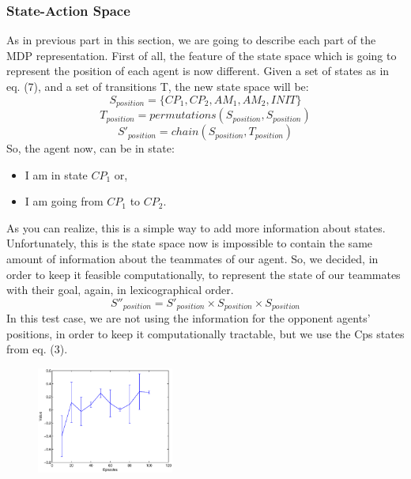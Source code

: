 \documentclass[conference]{IEEEtran}
\begin{document}
\subsubsection{State-Action Space}
As in previous part in this section, we are going to describe each part of the MDP representation. First of all, the feature of the state space which is going to represent the position of each agent is now different. Given a set of states as in eq. (7), and a set of transitions T, the new state space will be:
\begin{equation}
S_{position} = \lbrace CP_1, CP_2, AM_1, AM_2, INIT  \rbrace
\end{equation}
\begin{equation}
T_{position} = permutations(S_{position}, S_{position})
\end{equation}
\begin{equation}
S'_{position} = chain(S_{position}, T_{position})
\end{equation}
So, the agent now, can be in state:
\begin{itemize}
\item I am in state $CP_1$ or,
\item I am going from $CP_1$ to $CP_2$.
\end{itemize}
As you can realize, this is a simple way to add more information about states. Unfortunately, this is the state space now is impossible to contain the same amount of information about the teammates of our agent. So, we decided, in order to keep it feasible computationally, to represent the state of our teammates with their goal, again, in lexicographical order.
\begin{equation}
S''_{position} = S'_{position} \times S_{position} \times S_{position} 
\end{equation}
In this test case, we are not using the information for the opponent agents' positions, in order to keep it computationally tractable, but we use the Cps states from eq. (3).

\begin{figure}
    \includegraphics[width=0.4\textwidth]{figures/snake1vs1.eps}
\end{figure}
\end{document}
